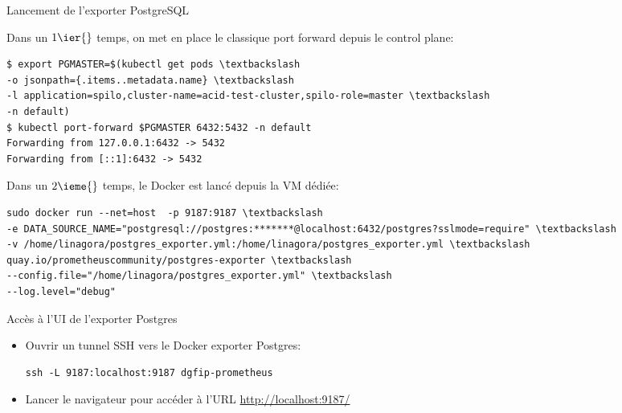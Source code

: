 \begin{frame}[fragile]{Lancement de l'exporter PostgreSQL}

   Dans un $1\ier{}$ temps, on met en place le classique port forward depuis le control plane:
\begin{tiny}
\begin{Verbatim}[commandchars=\\\{\}]
$ export PGMASTER=$(kubectl get pods \textbackslash
-o jsonpath={.items..metadata.name} \textbackslash
-l application=spilo,cluster-name=acid-test-cluster,spilo-role=master \textbackslash
-n default)
$ kubectl port-forward $PGMASTER 6432:5432 -n default
Forwarding from 127.0.0.1:6432 -> 5432
Forwarding from [::1]:6432 -> 5432
\end{Verbatim}
\end{tiny}

   Dans un $2\ieme{}$ temps, le Docker est lancé depuis la VM dédiée:

\begin{tiny}
\begin{Verbatim}[commandchars=\\\{\}]
sudo docker run --net=host  -p 9187:9187 \textbackslash
-e DATA_SOURCE_NAME="postgresql://postgres:*******@localhost:6432/postgres?sslmode=require" \textbackslash
-v /home/linagora/postgres_exporter.yml:/home/linagora/postgres_exporter.yml \textbackslash
quay.io/prometheuscommunity/postgres-exporter \textbackslash
--config.file="/home/linagora/postgres_exporter.yml" \textbackslash
--log.level="debug"
\end{Verbatim}
\end{tiny}

\end{frame}


\begin{frame}[fragile]{Accès à l'UI de l'exporter Postgres}

\begin{itemize}
\item Ouvrir un tunnel SSH vers le Docker exporter Postgres:
\begin{tiny}
\begin{Verbatim}[commandchars=\\\{\}]
ssh -L 9187:localhost:9187 dgfip-prometheus
\end{Verbatim}
\end{tiny}
\item Lancer le navigateur pour accéder à l'URL \url{http://localhost:9187/}
\end{itemize}

\end{frame}

